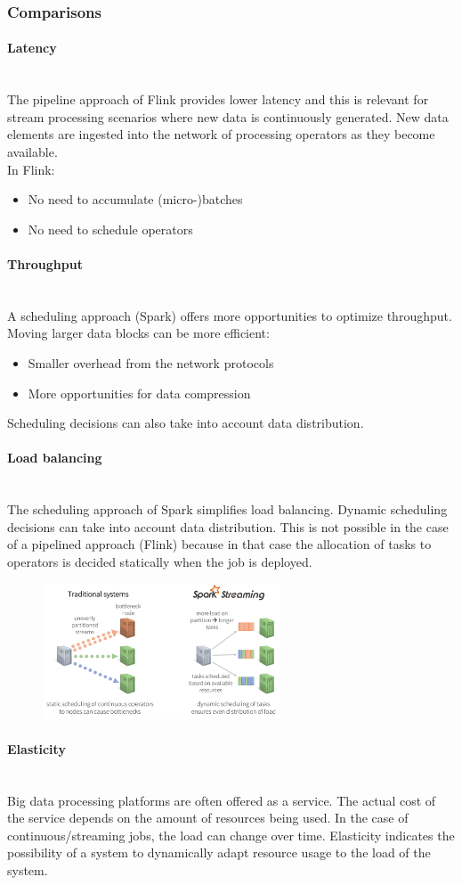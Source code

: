 \documentclass[10pt,a4paper]{article}
\newcommand{\myparagraph}[1]{\paragraph{#1}\mbox{}\\[0.05in]}
\begin{document}
\subsubsection{Comparisons}
\myparagraph{Latency}
The pipeline approach of Flink provides lower latency and this is relevant for stream processing scenarios where new data is continuously generated. New data elements are ingested into the network of processing operators as they become available. \\
In Flink:
\begin{itemize}
	\item No need to accumulate (micro-)batches
	\item No need to schedule operators
\end{itemize}
\myparagraph{Throughput}
A scheduling approach (Spark) offers more opportunities to optimize throughput. Moving larger data blocks can be more efficient:
\begin{itemize}
	\item Smaller overhead from the network protocols
	\item More opportunities for data compression
\end{itemize}
Scheduling decisions can also take into account data distribution.
\myparagraph{Load balancing}
The scheduling approach of Spark simplifies load balancing. Dynamic scheduling decisions can take into account data distribution. This is not possible in the case of a pipelined approach (Flink) because in that case the allocation of tasks to operators is decided statically when the job is deployed.
\begin{figure}[h!]
\hfill \includegraphics[width=200pt]{images/spark.png}\hspace*{\fill}
  \label{fig:spark}
\end{figure} 
\myparagraph{Elasticity}
Big data processing platforms are often offered as a service. The actual cost of the service depends on the amount of resources being used. In the case of continuous/streaming jobs, the load can change over time. Elasticity indicates the possibility of a system to dynamically adapt resource usage to the load of the system. \\ \\
\end{document}
